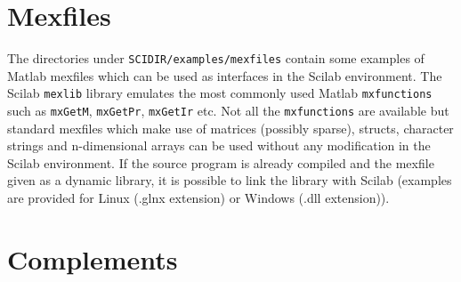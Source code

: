 \section{Mexfiles}
The directories under \verb!SCIDIR/examples/mexfiles! contain 
some examples of Matlab mexfiles which can be used as interfaces
in the Scilab environment. The Scilab \verb!mexlib! library emulates
the most commonly used Matlab \verb!mxfunctions! such as 
\verb!mxGetM!, \verb!mxGetPr!, \verb!mxGetIr! etc. Not all the 
\verb!mxfunctions! are available but standard mexfiles which make use
of matrices (possibly sparse), structs, character strings 
and n-dimensional arrays can be used without any modification 
in the Scilab environment. If the source program is already compiled
and the mexfile given as a dynamic library, it is possible to  link
the library with Scilab (examples are provided for Linux (.glnx extension)
or Windows (.dll extension)).

\section{Complements} 
